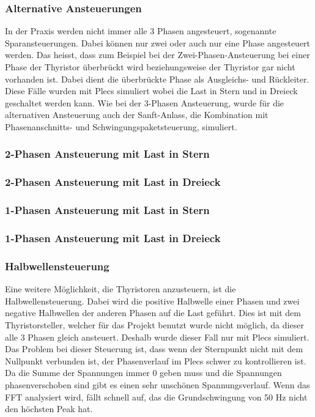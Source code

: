 \subsubsection{Alternative Ansteuerungen}
In der Praxis werden nicht immer alle 3 Phasen angesteuert, sogenannte Sparansteuerungen. Dabei können nur zwei oder auch nur eine Phase angesteuert werden. Das heisst, dass zum Beispiel bei der Zwei-Phasen-Ansteuerung bei einer Phase der Thyristor überbrückt wird beziehungsweise der Thyristor gar nicht vorhanden ist. Dabei dient die überbrückte Phase als Ausgleichs- und Rückleiter. Diese Fälle wurden mit Plecs simuliert wobei die Last in Stern und in Dreieck geschaltet werden kann. Wie bei der 3-Phasen Ansteuerung, wurde für die alternativen Ansteuerung auch der Sanft-Anlass, die Kombination mit Phasenanschnitts- und Schwingungspaketsteuerung, simuliert.

\subsubsection*{2-Phasen Ansteuerung mit Last in Stern}

 
\subsubsection*{2-Phasen Ansteuerung mit Last in Dreieck}


\subsubsection*{1-Phasen Ansteuerung mit Last in Stern}


\subsubsection*{1-Phasen Ansteuerung mit Last in Dreieck}


\subsubsection*{Halbwellensteuerung}
Eine weitere Möglichkeit, die Thyristoren anzusteuern, ist die Halbwellensteuerung. Dabei wird die positive Halbwelle einer Phasen und zwei negative Halbwellen der anderen Phasen auf die Last geführt. Dies ist mit dem Thyristorsteller, welcher für das Projekt benutzt wurde nicht möglich, da dieser alle 3 Phasen gleich ansteuert. Deshalb wurde dieser Fall nur mit Plecs simuliert.  Das Problem bei dieser Steuerung ist, dass wenn der Sternpunkt nicht mit dem Nullpunkt verbunden ist, der Phasenverlauf im Plecs schwer zu kontrollieren ist. Da die Summe der Spannungen immer 0 geben muss und die Spannungen phasenverschoben sind gibt es einen sehr unschönen Spannungsverlauf. Wenn das FFT analysiert wird, fällt schnell auf, das die Grundschwingung von 50 Hz nicht den höchsten Peak hat.



